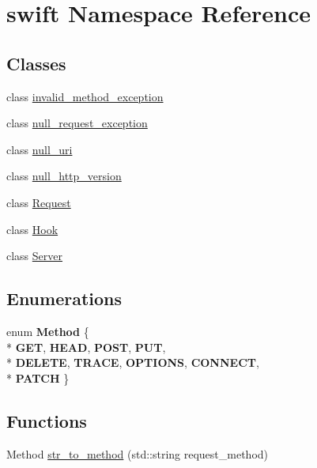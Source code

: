 \hypertarget{namespaceswift}{\section{swift Namespace Reference}
\label{namespaceswift}
}
\subsection*{Classes}
\begin{DoxyCompactItemize}
\item 
class \hyperlink{classswift_1_1invalid__method__exception}{invalid\-\_\-method\-\_\-exception}
\item 
class \hyperlink{classswift_1_1null__request__exception}{null\-\_\-request\-\_\-exception}
\item 
class \hyperlink{classswift_1_1null__uri}{null\-\_\-uri}
\item 
class \hyperlink{classswift_1_1null__http__version}{null\-\_\-http\-\_\-version}
\item 
class \hyperlink{classswift_1_1_request}{Request}
\item 
class \hyperlink{classswift_1_1_hook}{Hook}
\item 
class \hyperlink{classswift_1_1_server}{Server}
\end{DoxyCompactItemize}
\subsection*{Enumerations}
\begin{DoxyCompactItemize}
\item 
enum {\bfseries Method} \{ \\*
{\bfseries G\-E\-T}, 
{\bfseries H\-E\-A\-D}, 
{\bfseries P\-O\-S\-T}, 
{\bfseries P\-U\-T}, 
\\*
{\bfseries D\-E\-L\-E\-T\-E}, 
{\bfseries T\-R\-A\-C\-E}, 
{\bfseries O\-P\-T\-I\-O\-N\-S}, 
{\bfseries C\-O\-N\-N\-E\-C\-T}, 
\\*
{\bfseries P\-A\-T\-C\-H}
 \}
\end{DoxyCompactItemize}
\subsection*{Functions}
\begin{DoxyCompactItemize}
\item 
Method \hyperlink{namespaceswift_a54d9cafe8eb822e4a2fedef9d724a702}{str\-\_\-to\-\_\-method} (std\-::string request\-\_\-method)
\end{DoxyCompactItemize}
